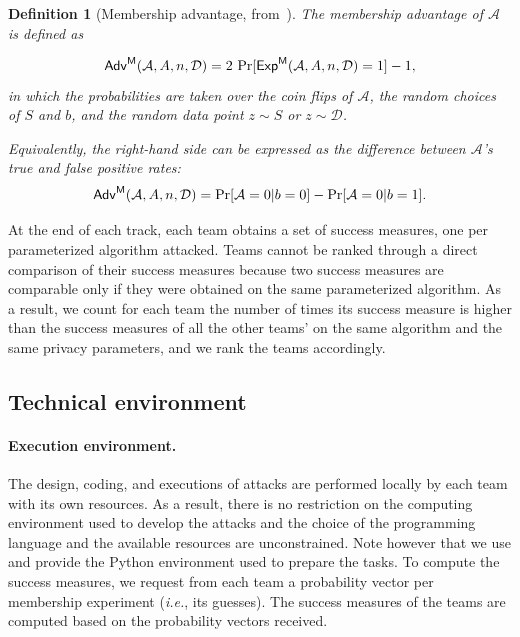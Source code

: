 \documentclass{article}
\newtheorem*{definition}{Definition}
\begin{document}
\begin{definition}[Membership advantage, from~\cite{yeom2018}]
  \label{def:membadv}
  The \textup{membership advantage} of $\mathcal{A}$ is defined as

  \begin{equation*}
    \textup{\textsf{Adv}}^{\textup{\textsf{M}}}(\mathcal{A}, A, n, \mathcal{D})= 2~\textup{Pr}[\textup{\textsf{Exp}}^{\textup{\textsf{M}}}(\mathcal{A}, A, n, \mathcal{D})=1] - 1,
  \end{equation*}
  in which the probabilities are taken over the coin flips of
  $\mathcal{A}$, the random choices of $S$ and $b$, and the random data
  point $z \sim S$ or $z \sim \mathcal{D}$.

  Equivalently, the right-hand side can be expressed as the difference
  between $\mathcal{A}$'s true and false positive rates:
  \begin{equation*}
    \textup{\textsf{Adv}}^{\textup{\textsf{M}}}(\mathcal{A}, A, n, \mathcal{D}) = \textup{Pr}[\mathcal{A} = 0 | b = 0] - \textup{Pr}[\mathcal{A} = 0 | b = 1].
  \end{equation*}
\end{definition}

At the end of each track, each team obtains a set of success measures, one per parameterized algorithm attacked.
Teams cannot be ranked through a direct comparison of their success measures because two success measures are comparable only if they were obtained on the same parameterized algorithm.
As a result, we count for each team the number of times its success measure is higher than the success measures of all the other teams' on the same algorithm and the same privacy parameters, and we rank the teams accordingly.

\subsection{Technical environment}

\paragraph{Execution environment.}
The design, coding, and executions of attacks are performed locally by each team with its own resources.
As a result, there is no restriction on the computing environment used to develop the attacks and the choice of the programming language and the available resources are unconstrained.
Note however that we use and provide the Python environment used to prepare the tasks.
To compute the success measures, we request from each team a probability vector per membership experiment (\textit{i.e.}, its guesses).
The success measures of the teams are computed based on the probability vectors received.
\end{document}

